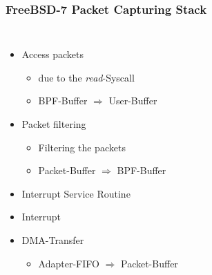 \documentclass{beamer}
\begin{document}
\begin{frame}
\frametitle{FreeBSD-7 Packet Capturing Stack}
\begin{columns}
\vspace{0em}
\begin{itemize}
\item <7-> Access packets
	\begin{itemize}
		\item <7->due to the \emph{read}-Syscall
		\item <7->BPF-Buffer $\Rightarrow$ 	User-Buffer
	\end{itemize}
\item <5-> Packet filtering
	\begin{itemize}
		\item <5->Filtering the packets 
		\item <6->Packet-Buffer $\Rightarrow$ BPF-Buffer
	\end{itemize}
\item <4-> Interrupt Service Routine
\item <3-> Interrupt
\item <2-> DMA-Transfer
	\begin{itemize}
		\item <2->Adapter-FIFO $\Rightarrow$ Packet-Buffer
	\end{itemize}
\end{itemize}
\vspace{-2em}
\begin{figure}

\end{figure}
\end{columns}
\end{frame}
\end{document}
